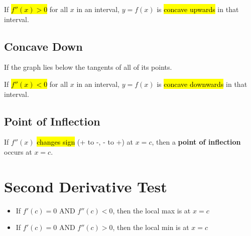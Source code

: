 \documentclass[a4paper,12pt]{article}
\begin{document}
If \hl{$f''(x) > 0$} for all $x$ in an interval, $y = f(x)$ is \hl{concave upwards} in that interval.

\subsection{Concave Down}
If the graph lies below the tangents of all of its points.

If \hl{$f''(x) < 0$} for all $x$ in an interval, $y = f(x)$ is \hl{concave downwards} in that interval.

\subsection{Point of Inflection}
If $f''(x)$ \hl{changes sign} (+ to -, - to +) at $x = c$, then a \textbf{point of inflection} occurs at $x = c$.

\section{Second Derivative Test}
\begin{itemize}
    \item{If $f'(c) = 0$ AND $f''(c) < 0$, then the local max is at $x = c$}
    \item{If $f'(c) = 0$ AND $f''(c) > 0$, then the local min is at $x = c$}
\end{itemize}
\end{document}
